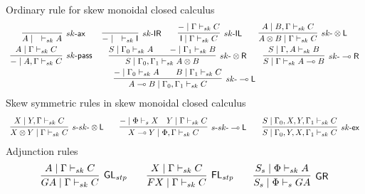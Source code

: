 \documentclass{article}
\newcommand{\tl}{\otimes \mathsf{L}}
\newcommand{\tr}{\otimes \mathsf{R}}
\newcommand{\lright}{\multimap \mathsf{R}}
\newcommand{\lleft}{\multimap \mathsf{L}}
\newcommand{\pass}{\mathsf{pass}}
\newcommand{\unitl}{\mathsf{IL}}
\newcommand{\unitr}{\mathsf{IR}}
\newcommand{\ax}{\mathsf{ax}}
\newcommand{\ot}{\otimes}
\newcommand{\lolli}{\multimap}
\newcommand{\I}{\mathsf{I}}
\newcommand{\fl}{\mathsf{FL}}
\newcommand{\gl}{\mathsf{GL}}
\newcommand{\gr}{\mathsf{GR}}
\newcommand{\td}{\text{-}}
\newcommand{\ex}{\mathsf{ex}}
\begin{document}
 Ordinary rule for skew monoidal closed calculus
 \begin{displaymath}
   \begin{array}{cc}
     \infer[sk\text{-}\ax]{A \mid \quad \vdash_{sk} A}{}
     \qquad
     \infer[sk\text{-}\unitr]{- \mid \quad \vdash_{sk} \I}{}
     \qquad
     \infer[sk\text{-}\unitl]{\I \mid \Gamma \vdash_{sk} C}{- \mid \Gamma \vdash_{sk} C}
     \qquad
     \infer[sk\text{-}\tl]{A \ot B \mid \Gamma \vdash_{sk} C}{A \mid B , \Gamma \vdash_{sk} C}
     \\
     \infer[sk\td\pass]{- \mid A, \Gamma \vdash_{sk} C}{A \mid \Gamma \vdash_{sk} C}
     \qquad
     \infer[sk\text{-}\tr]{S \mid \Gamma_{0} , \Gamma_{1} \vdash_{sk} A \ot B}{
      \deduce{S \mid \Gamma_{0} \vdash_{sk} A}{}
      \qquad
      \deduce{- \mid \Gamma_{1} \vdash_{sk} B}{}
     }
     \qquad
     \infer[sk\text{-}\lright]{S \mid \Gamma \vdash_{sk} A \lolli B}{S \mid \Gamma , A \vdash_{sk} B}
     \\
     \infer[sk\text{-}\lleft]{A \lolli B \mid \Gamma_{0} , \Gamma_{1} \vdash_{sk} C}{
      \deduce{- \mid \Gamma_{0} \vdash_{sk} A}{}
      \qquad
      \deduce{B \mid \Gamma_{1} \vdash_{sk} C}{}
     }
   \end{array}
 \end{displaymath}
 Skew symmetric rules in skew monoidal closed calculus
     \begin{displaymath}
       \begin{array}{cc}
         \infer[s\text{-}sk\text{-}\tl]{X \ot Y \mid \Gamma \vdash_{sk} C}{X \mid Y , \Gamma \vdash_{sk} C}
         \qquad
         \infer[s\text{-}sk\text{-}\lleft]{X \lolli Y \mid \Phi , \Gamma \vdash_{sk} C}{
          \deduce{- \mid \Phi \vdash_{s} X}{}
          &
          \deduce{Y \mid \Gamma \vdash_{sk} C}{}
         }
         \qquad
         \infer[sk\text{-}\ex]{S \mid \Gamma_{0} , Y , X , \Gamma_{1} \vdash_{sk} C}{S \mid \Gamma_{0} , X , Y , \Gamma_{1} \vdash_{sk} C}
       \end{array}
     \end{displaymath}
  Adjunction rules
  \begin{displaymath}
    \begin{array}{cc}
      \infer[\gl_{stp}]{GA \mid \Gamma \vdash_{sk} C}{A \mid \Gamma \vdash_{sk} C}
      \qquad
      \infer[\fl_{stp}]{FX \mid \Gamma \vdash_{sk} C}{X \mid \Gamma \vdash_{sk} C}
      \qquad
      \infer[\gr]{S_{s} \mid \Phi \vdash_{s} GA}{S_{s} \mid \Phi \vdash_{sk} A}
    \end{array}
  \end{displaymath}
\end{document}
